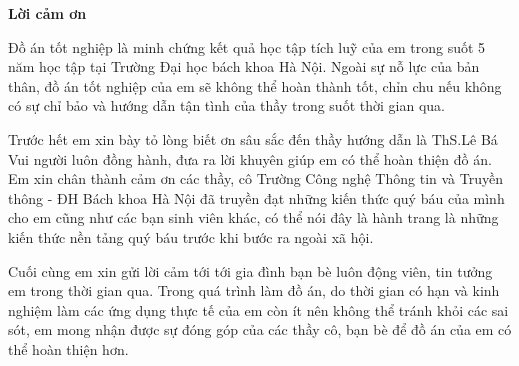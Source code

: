 \documentclass[../Main.tex]{subfiles}
\begin{document}
\begin{center}
    \Large{\textbf{Lời cảm ơn}}\\
\end{center}
\vspace{1cm}

Đồ án tốt nghiệp là minh chứng kết quả học tập tích luỹ của em trong suốt 5 năm học tập tại Trường Đại học bách khoa Hà Nội. Ngoài sự nỗ lực của bản thân, đồ án tốt nghiệp của em sẽ không thể hoàn thành tốt, chỉn chu nếu không có sự chỉ bảo và hướng dẫn tận tình của thầy trong suốt thời gian qua.

Trước hết em xin bày tỏ lòng biết ơn sâu sắc đến thầy hướng dẫn là ThS.Lê Bá Vui người luôn đồng hành, đưa ra lời khuyên giúp em có thể hoàn thiện đồ án. Em xin chân thành cảm ơn các thầy, cô Trường Công nghệ Thông tin và Truyền thông - ĐH Bách khoa Hà Nội đã truyền đạt những kiến thức quý báu của mình cho em cũng như các bạn sinh viên khác, có thể nói đây là hành trang là những kiến thức nền tảng quý báu trước khi bước ra ngoài xã hội.

Cuối cùng em xin gửi lời cảm tới tới gia đình bạn bè luôn động viên, tin tưởng em trong thời gian qua. Trong quá trình làm đồ án, do thời gian có hạn và kinh nghiệm làm các ứng dụng thực tế của em còn ít nên không thể tránh khỏi các sai sót, em mong nhận được sự đóng góp của các thầy cô, bạn bè để đồ án của em có thể hoàn thiện hơn. 
\end{document}
